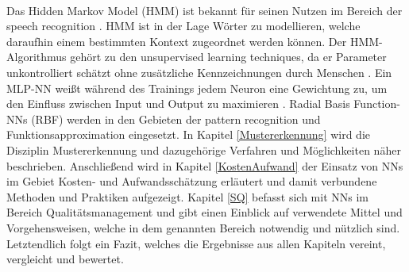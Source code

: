 \\
Das Hidden Markov Model (HMM) ist bekannt für seinen Nutzen im Bereich der speech recognition \cite{residualnn}. HMM ist in der Lage Wörter zu modellieren, welche daraufhin einem bestimmten Kontext zugeordnet werden können. Der HMM-Algorithmus gehört zu den unsupervised learning techniques, da er Parameter unkontrolliert schätzt ohne zusätzliche Kennzeichnungen durch Menschen \cite{hmm}. Ein MLP-NN weißt während des Trainings jedem Neuron eine Gewichtung zu, um den Einfluss zwischen Input und Output zu maximieren \cite{Khalifelu2012}. Radial Basis Function-NNs (RBF) werden in den Gebieten der pattern recognition und Funktionsapproximation eingesetzt. In Kapitel \ref{Mustererkennung} wird die Disziplin Mustererkennung und dazugehörige Verfahren und Möglichkeiten näher beschrieben. Anschließend wird in Kapitel \ref{KostenAufwand} der Einsatz von NNs im Gebiet Kosten- und Aufwandsschätzung erläutert und damit verbundene Methoden und Praktiken aufgezeigt. Kapitel \ref{SQ} befasst sich mit NNs im Bereich Qualitätsmanagement und gibt einen Einblick auf verwendete Mittel und Vorgehensweisen, welche in dem genannten Bereich notwendig und nützlich sind. Letztendlich folgt ein Fazit, welches die Ergebnisse aus allen Kapiteln vereint, vergleicht und bewertet.

\vspace{3.0cm}
